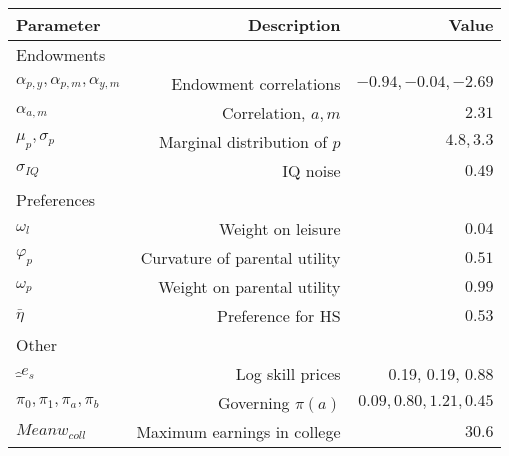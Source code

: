 \begin{tabular}{lrr}
\hline
Parameter & Description  & Value  \\
\hline
Endowments &   &   \\
$\alpha_{p,y}, \alpha_{p,m}, \alpha_{y,m}$ & Endowment correlations  & $-0.94, -0.04, -2.69$  \\
$\alpha_{a,m}$ & Correlation, $a,m$  & $2.31$  \\
$\mu_{p}, \sigma_{p}$ & Marginal distribution of $p$  & $4.8, 3.3$  \\
$\sigma_{IQ}$ & IQ noise  & $0.49$  \\
Preferences &   &   \\
$\omega_{l}$ & Weight on leisure  & $0.04$  \\
$\varphi_{p}$ & Curvature of parental utility  & $0.51$  \\
$\omega_{p}$ & Weight on parental utility  & $0.99$  \\
$\bar{\eta}$ & Preference for HS  & $0.53$  \\
Other &   &   \\
$\hat_{e}_{s}$ & Log skill prices  & 0.19, 0.19, 0.88  \\
$\pi_{0}, \pi_{1}, \pi_{a}, \pi_{b}$ & Governing $\pi(a)$  & $0.09, 0.80, 1.21, 0.45$  \\
$Mean w_{coll}$ & Maximum earnings in college  & $30.6$  \\
\hline
\end{tabular}%

